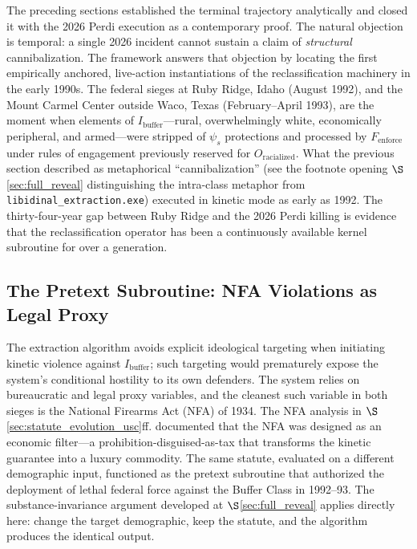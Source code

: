 The preceding sections established the terminal trajectory analytically and closed it with the 2026 Perdi execution as a contemporary proof. The natural objection is temporal: a single 2026 incident cannot sustain a claim of \textit{structural} cannibalization. The framework answers that objection by locating the first empirically anchored, live-action instantiations of the reclassification machinery in the early 1990s. The federal sieges at Ruby Ridge, Idaho (August 1992), and the Mount Carmel Center outside Waco, Texas (February--April 1993), are the moment when elements of $I_{\text{buffer}}$---rural, overwhelmingly white, economically peripheral, and armed---were stripped of $\psi_s$ protections and processed by $F_{\text{enforce}}$ under rules of engagement previously reserved for $O_{\text{racialized}}$. What the previous section described as metaphorical ``cannibalization'' (see the footnote opening $\S$\ref{sec:full_reveal} distinguishing the intra-class metaphor from \texttt{libidinal\_extraction.exe}) executed in kinetic mode as early as 1992. The thirty-four-year gap between Ruby Ridge and the 2026 Perdi killing is evidence that the reclassification operator has been a continuously available kernel subroutine for over a generation.

\subsection{The Pretext Subroutine: NFA Violations as Legal Proxy}
\label{subsec:nfa_pretext}

The extraction algorithm avoids explicit ideological targeting when initiating kinetic violence against $I_{\text{buffer}}$; such targeting would prematurely expose the system's conditional hostility to its own defenders. The system relies on bureaucratic and legal proxy variables, and the cleanest such variable in both sieges is the National Firearms Act (NFA) of 1934. The NFA analysis in $\S$\ref{sec:statute_evolution_usc}ff. documented that the NFA was designed as an economic filter---a prohibition-disguised-as-tax that transforms the kinetic guarantee into a luxury commodity. The same statute, evaluated on a different demographic input, functioned as the pretext subroutine that authorized the deployment of lethal federal force against the Buffer Class in 1992--93. The substance-invariance argument developed at $\S$\ref{sec:full_reveal} applies directly here: change the target demographic, keep the statute, and the algorithm produces the identical output.

